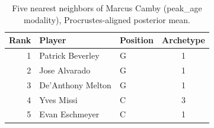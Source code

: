 \begin{table}[htbp]
  \centering\small
  \begin{tabular}{rllc}
    \toprule
    Rank & Player & Position & Archetype \\
    \midrule
    1 & Patrick Beverley & G & 1 \\
    2 & Jose Alvarado & G & 1 \\
    3 & De'Anthony Melton & G & 1 \\
    4 & Yves Missi & C & 3 \\
    5 & Evan Eschmeyer & C & 1 \\
    \bottomrule
  \end{tabular}
  \caption{Five nearest neighbors of Marcus Camby (peak_age modality), Procrustes-aligned posterior mean.}
  \label{tab:Marcus_Camby_neighbors_peak_age}
\end{table}

